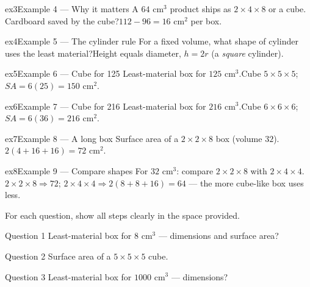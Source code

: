 \documentclass[11pt]{article}
\begin{document}
\begin{example}{ex3}{Example 4 --- Why it matters}
A $64$ cm$^3$ product ships as $2\times4\times8$ or a cube. Cardboard saved by the cube?\soln $112-96=16$ cm$^2$ per box.
\end{example}

\begin{example}{ex4}{Example 5 --- The cylinder rule}
For a fixed volume, what shape of cylinder uses the least material?\soln Height equals diameter, $h=2r$ (a \emph{square} cylinder).
\end{example}

\begin{example}{ex5}{Example 6 --- Cube for 125}
Least-material box for $125$ cm$^3$.\soln Cube $5\times5\times5$; $SA=6(25)=150$ cm$^2$.
\end{example}

\begin{example}{ex6}{Example 7 --- Cube for 216}
Least-material box for $216$ cm$^3$.\soln Cube $6\times6\times6$; $SA=6(36)=216$ cm$^2$.
\end{example}

\begin{example}{ex7}{Example 8 --- A long box}
Surface area of a $2\times2\times8$ box (volume $32$).\soln $2(4+16+16)=72$ cm$^2$.
\end{example}

\begin{example}{ex8}{Example 9 --- Compare shapes}
For $32$ cm$^3$: compare $2\times2\times8$ with $2\times4\times4$.\soln $2\times2\times8\Rightarrow72$; $2\times4\times4\Rightarrow2(8+8+16)=64$ — the more cube-like box uses less.
\end{example}

\clearpage
{}
For each question, show all steps clearly in the space provided.

\begin{qbox}{Question 1}
Least-material box for $8$ cm$^3$ — dimensions and surface area?\workspace{2.4cm}
\end{qbox}

\begin{qbox}{Question 2}
Surface area of a $5\times5\times5$ cube.\workspace{2.4cm}
\end{qbox}

\begin{qbox}{Question 3}
Least-material box for $1000$ cm$^3$ — dimensions?\workspace{2.4cm}
\end{qbox}
\end{document}
